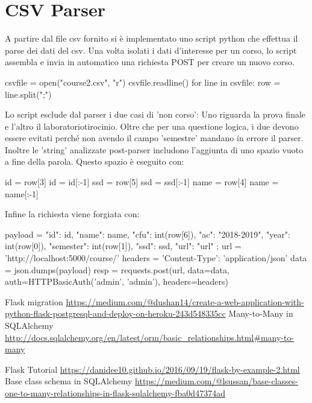 \documentclass{article}
\begin{document}
\newpage
\section{CSV Parser}
A partire dal file csv fornito si è implementato uno script python che effettua il parse dei dati del csv. Una volta isolati i dati d'interesse per un corso, lo script assembla e invia in automatico una richiesta POST per creare un nuovo corso.
\begin{python}[caption=Data parser]
csvfile = open("course2.csv", "r") 
csvfile.readline() 
for line in csvfile:
	row = line.split(";")
\end{python}
Lo script esclude dal parser i due casi di 'non corso': Uno riguarda la prova finale e l'altro il laboratorio\/tirocinio.
Oltre che per una questione logica, i due devono essere evitati perché non avendo il campo 'semestre' mandano in errore il parser.
Inoltre le 'string' analizzate post-parser includono l'aggiunta di uno spazio vuoto a fine della parola. Questo spazio è eseguito con:
\begin{python}[caption=String manupulation]
		id = row[3]
		id = id[:-1]
		ssd = row[5]
		ssd = ssd[:-1]
		name = row[4]
		name = name[:-1]
\end{python}
Infine la richiesta viene forgiata con:
\begin{python}[caption = send JSON POST req]
payload = {
	"id": id,
	"name": name,
	"cfu": int(row[6]), 
	"ac": "2018-2019", 
	"year": int(row[0]), 
	"semester": int(row[1]), 
	"ssd": ssd, 
	"url": "url"
};
url = 'http://localhost:5000/course/'
headers = {'Content-Type': 'application/json'}
data = json.dumps(payload)
resp = requests.post(url, data=data, auth=HTTPBasicAuth('admin', 'admin'), headers=headers)
\end{python}
\newpage
\begin{thebibliography}{Bibliografia}
  Flask migration \url{https://medium.com/@dushan14/create-a-web-application-with-python-flask-postgresql-and-deploy-on-heroku-243d548335cc}
  Many-to-Many in SQLAlchemy  \url{http://docs.sqlalchemy.org/en/latest/orm/basic_relationships.html#many-to-many}

  Flask Tutorial \url{https://danidee10.github.io/2016/09/19/flask-by-example-2.html}
  Base class schema in SQLAlchemy \url{https://medium.com/@lsussan/base-classes-one-to-many-relationships-in-flask-sqlalchemy-fba0d47374ad}
\end{thebibliography}
\end{document}

